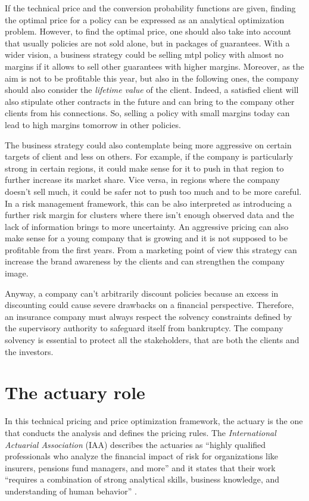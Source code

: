 \documentclass[a4paper, twoside, openright, 12pt]{report}
\theoremstyle{definition}
\theoremstyle{definition}
\theoremstyle{definition}
\theoremstyle{remark}
\begin{document}
If the technical price and the conversion probability functions are given, finding the optimal price for a policy can be expressed as an analytical optimization problem. However, to find the optimal price, one should also take into account that usually policies are not sold alone, but in packages of guarantees. With a wider vision, a business strategy could be selling \ac{mtpl} policy with almost no margins if it allows to sell other guarantees with higher margins. Moreover, as the aim is not to be profitable this year, but also in the following ones, the company should also consider the \emph{lifetime value} of the client. Indeed, a satisfied client will also stipulate other contracts in the future and can bring to the company other clients from his connections. So, selling a policy with small margins today can lead to high margins tomorrow in other policies.

The business strategy could also contemplate being more aggressive on certain targets of client and less on others. For example, if the company is particularly strong in certain regions, it could make sense for it to push in that region to further increase its market share. Vice versa, in regions where the company doesn't sell much, it could be safer not to push too much and to be more careful. In a risk management framework, this can be also interpreted as introducing a further risk margin for clusters where there isn't enough observed data and the lack of information brings to more uncertainty. An aggressive pricing can also make sense for a young company that is growing and it is not supposed to be profitable from the first years. From a marketing point of view this strategy can increase the brand awareness by the clients and can strengthen the company image.

Anyway, a company can't arbitrarily discount policies because an excess in discounting could cause severe drawbacks on a financial perspective. Therefore, an insurance company must always respect the solvency constraints defined by the supervisory authority to safeguard itself from bankruptcy. The company solvency is essential to protect all the stakeholders, that are both the clients and the investors.

\hypertarget{chap:actuary-role}{%
\section{The actuary role}\label{chap:actuary-role}}

In this technical pricing and price optimization framework, the actuary is the one that conducts the analysis and defines the pricing rules. The \emph{International Actuarial Association} (IAA) describes the actuaries as ``highly qualified professionals who analyze the financial impact of risk for organizations like insurers, pensions fund managers, and more'' and it states that their work ``requires a combination of strong analytical skills, business knowledge, and understanding of human behavior'' \autocite{iaa-about-actuaries}.
\end{document}
